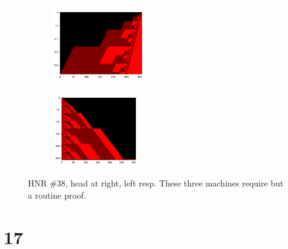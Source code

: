 \documentclass[12pt]{article}
\begin{document}
\begin{figure}[H]
\centering
\begin{subfigure}
\centering
\includegraphics[width=0.45\textwidth]{38-r.png}
\label{fig:38r}
\end{subfigure}
\hfill
\begin{subfigure}
\centering
\includegraphics[width=0.45\textwidth]{38.png}
\label{fig:38l}
\end{subfigure}
\caption{HNR \#38, head at right, left resp. These three machines require but a routine proof.}
\end{figure}




\clearpage
{}
{}
\section*{17}
\end{document}

